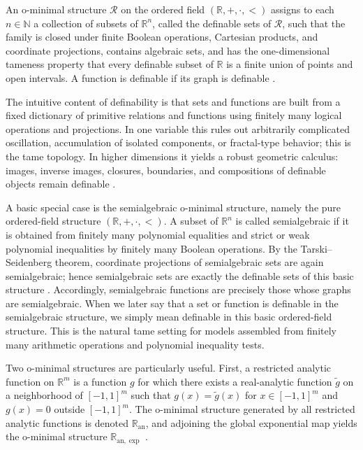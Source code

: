 \documentclass[11pt]{article}
\begin{document}
An o-minimal structure $\mathcal{R}$ on the ordered field $(\mathbb{R},+,\cdot,<)$
assigns to each $n\in\mathbb{N}$ a collection of subsets of $\mathbb{R}^{n}$,
called the definable sets of $\mathcal{R}$, such that the family
is closed under finite Boolean operations, Cartesian products, and
coordinate projections, contains algebraic sets, and has the one-dimensional
tameness property that every definable subset of $\mathbb{R}$ is
a finite union of points and open intervals. A function is definable
if its graph is definable \citep[Section~1]{LeLoi2010}.

The intuitive content of definability is that sets and functions are
built from a fixed dictionary of primitive relations and functions
using finitely many logical operations and projections. In one variable
this rules out arbitrarily complicated oscillation, accumulation of
isolated components, or fractal-type behavior; this is the tame topology.
In higher dimensions it yields a robust geometric calculus: images,
inverse images, closures, boundaries, and compositions of definable
objects remain definable \citep[Section~2]{LeLoi2010}.

A basic special case is the semialgebraic o-minimal structure, namely
the pure ordered-field structure $(\mathbb{R},+,\cdot,<)$. A subset
of $\mathbb{R}^{n}$ is called semialgebraic if it is obtained from
finitely many polynomial equalities and strict or weak polynomial
inequalities by finitely many Boolean operations. By the Tarski--Seidenberg
theorem, coordinate projections of semialgebraic sets are again semialgebraic;
hence semialgebraic sets are exactly the definable sets of this basic
structure \citep[Chapter~2]{vdDries1998}. Accordingly, semialgebraic
functions are precisely those whose graphs are semialgebraic. When
we later say that a set or function is definable in the semialgebraic
structure, we simply mean definable in this basic ordered-field structure.
This is the natural tame setting for models assembled from finitely
many arithmetic operations and polynomial inequality tests.

Two o-minimal structures are particularly useful. First, a
restricted analytic function on $\mathbb{R}^{m}$ is a function $g$
for which there exists a real-analytic function $\tilde{g}$ on a
neighborhood of $[-1,1]^{m}$ such that $g(x)=\tilde{g}(x)$ for $x\in[-1,1]^{m}$
and $g(x)=0$ outside $[-1,1]^{m}$. The o-minimal structure generated
by all restricted analytic functions is denoted $\mathbb{R}_{\mathrm{an}}$,
and adjoining the global exponential map yields the o-minimal structure
$\mathbb{R}_{\mathrm{an},\exp}$ \citep[Examples~1.5--1.7]{LeLoi2010}.
\end{document}
